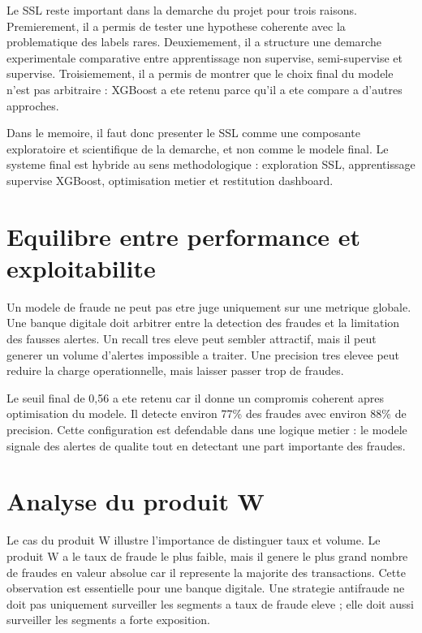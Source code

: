 ﻿\documentclass[12pt,a4paper,oneside]{report}
\begin{document}
Le SSL reste important dans la demarche du projet pour trois raisons. Premierement, il a permis de tester une hypothese coherente avec la problematique des labels rares. Deuxiemement, il a structure une demarche experimentale comparative entre apprentissage non supervise, semi-supervise et supervise. Troisiemement, il a permis de montrer que le choix final du modele n'est pas arbitraire : XGBoost a ete retenu parce qu'il a ete compare a d'autres approches.

Dans le memoire, il faut donc presenter le SSL comme une composante exploratoire et scientifique de la demarche, et non comme le modele final. Le systeme final est hybride au sens methodologique : exploration SSL, apprentissage supervise XGBoost, optimisation metier et restitution dashboard.

\section{Equilibre entre performance et exploitabilite}

Un modele de fraude ne peut pas etre juge uniquement sur une metrique globale. Une banque digitale doit arbitrer entre la detection des fraudes et la limitation des fausses alertes. Un recall tres eleve peut sembler attractif, mais il peut generer un volume d'alertes impossible a traiter. Une precision tres elevee peut reduire la charge operationnelle, mais laisser passer trop de fraudes.

Le seuil final de 0,56 a ete retenu car il donne un compromis coherent apres optimisation du modele. Il detecte environ 77\% des fraudes avec environ 88\% de precision. Cette configuration est defendable dans une logique metier : le modele signale des alertes de qualite tout en detectant une part importante des fraudes.

\section{Analyse du produit W}

Le cas du produit W illustre l'importance de distinguer taux et volume. Le produit W a le taux de fraude le plus faible, mais il genere le plus grand nombre de fraudes en valeur absolue car il represente la majorite des transactions. Cette observation est essentielle pour une banque digitale. Une strategie antifraude ne doit pas uniquement surveiller les segments a taux de fraude eleve ; elle doit aussi surveiller les segments a forte exposition.
\end{document}
